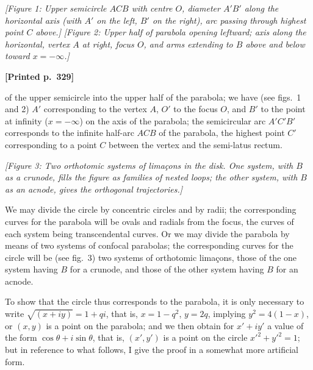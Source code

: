 \documentclass[11pt]{article}
\begin{document}
\medskip

\textit{[Figure 1: Upper semicircle $ACB$ with centre $O$, diameter $A'B'$ along the horizontal axis (with $A'$ on the left, $B'$ on the right), arc passing through highest point $C$ above.]}\quad
\textit{[Figure 2: Upper half of parabola opening leftward; axis along the horizontal, vertex $A$ at right, focus $O$, and arms extending to $B$ above and below toward $x = -\infty$.]}

\medskip

\noindent\textbf{[Printed p.~329]}\hfill

\medskip

of the upper semicircle into the upper half of the parabola; we have (see figs.\ 1 and 2) $A'$ corresponding to the vertex $A$, $O'$ to the focus $O$, and $B'$ to the point at infinity ($x = -\infty$) on the axis of the parabola; the semicircular arc $A'C'B'$ corresponds to the infinite half-arc $ACB$ of the parabola, the highest point $C'$ corresponding to a point $C$ between the vertex and the semi-latus rectum.

\medskip

\textit{[Figure 3: Two orthotomic systems of limaçons in the disk. One system, with $B$ as a crunode, fills the figure as families of nested loops; the other system, with $B$ as an acnode, gives the orthogonal trajectories.]}

\medskip

We may divide the circle by concentric circles and by radii; the corresponding curves for the parabola will be ovals and radials from the focus, the curves of each system being transcendental curves. Or we may divide the parabola by means of two systems of confocal parabolas; the corresponding curves for the circle will be (see fig.\ 3) two systems of orthotomic limaçons, those of the one system having $B$ for a crunode, and those of the other system having $B$ for an acnode.

\medskip

To show that the circle thus corresponds to the parabola, it is only necessary to write $\sqrt{(x + iy)} = 1 + qi$, that is, $x = 1 - q^{2}$, $y = 2q$, implying $y^{2} = 4(1 - x)$, or $(x, y)$ is a point on the parabola; and we then obtain for $x' + iy'$ a value of the form $\cos\theta + i\sin\theta$, that is, $(x', y')$ is a point on the circle $x'^{2} + y'^{2} = 1$; but in reference to what follows, I give the proof in a somewhat more artificial form.

\medskip
\end{document}
